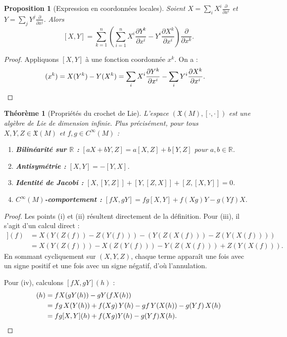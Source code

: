\documentclass[12pt,a4paper,openany]{book}
\theoremstyle{definition}
\theoremstyle{plain}
\newtheorem{theoreme}[definition]{Théorème}
\newtheorem{proposition}[definition]{Proposition}
\theoremstyle{remark}
\newcommand{\R}{\mathbb{R}}
\begin{document}
\begin{proposition}[Expression en coordonnées locales]\label{prop:crochet-coordonnees}
Soient $X = \sum_i X^i \frac{\partial}{\partial x^i}$ et
$Y = \sum_j Y^j \frac{\partial}{\partial x^j}$. Alors
\[
  [X, Y] = \sum_{k=1}^n \left(\sum_{i=1}^n X^i \frac{\partial Y^k}{\partial x^i}
  - Y^i \frac{\partial X^k}{\partial x^i}\right) \frac{\partial}{\partial x^k}.
\]
\end{proposition}

\begin{proof}
Appliquons $[X,Y]$ à une fonction coordonnée $x^k$. On a :
\begin{align*}
  [X,Y](x^k) &= X(Y^k) - Y(X^k)
  = \sum_i X^i \frac{\partial Y^k}{\partial x^i}
  - \sum_i Y^i \frac{\partial X^k}{\partial x^i}. \qedhere
\end{align*}
\end{proof}

\begin{theoreme}[Propriétés du crochet de Lie]\label{thm:proprietes-crochet}
L'espace $(\mathfrak{X}(M), [\cdot, \cdot])$ est une algèbre de Lie
de dimension infinie. Plus précisément, pour tous $X, Y, Z \in \mathfrak{X}(M)$
et $f, g \in C^\infty(M)$ :
\begin{enumerate}[label=(\roman*)]
  \item \textbf{Bilinéarité sur $\R$ :} $[aX + bY, Z] = a[X,Z] + b[Y,Z]$ pour $a, b \in \R$.
  \item \textbf{Antisymétrie :} $[X, Y] = -[Y, X]$.
  \item \textbf{Identité de Jacobi :}
    $[X, [Y, Z]] + [Y, [Z, X]] + [Z, [X, Y]] = 0$.
  \item \textbf{$C^\infty(M)$-comportement :} $[fX, gY] = fg[X,Y] + f(Xg)Y - g(Yf)X$.
\end{enumerate}
\end{theoreme}

\begin{proof}
Les points (i) et (ii) résultent directement de la définition. Pour (iii), il s'agit
d'un calcul direct :
\begin{align*}
  [X,[Y,Z]](f) &= X(Y(Z(f)) - Z(Y(f))) - (Y(Z(X(f))) - Z(Y(X(f)))) \\
                &= X(Y(Z(f))) - X(Z(Y(f))) - Y(Z(X(f))) + Z(Y(X(f))).
\end{align*}
En sommant cycliquement sur $(X,Y,Z)$, chaque terme apparaît une fois avec un signe
positif et une fois avec un signe négatif, d'où l'annulation.

Pour (iv), calculons $[fX, gY](h)$ :
\begin{align*}
  [fX, gY](h) &= fX(gY(h)) - gY(fX(h)) \\
  &= fg\,X(Y(h)) + f(Xg)\,Y(h) - gf\,Y(X(h)) - g(Yf)\,X(h) \\
  &= fg[X,Y](h) + f(Xg)Y(h) - g(Yf)X(h). \qedhere
\end{align*}
\end{proof}
\end{document}
